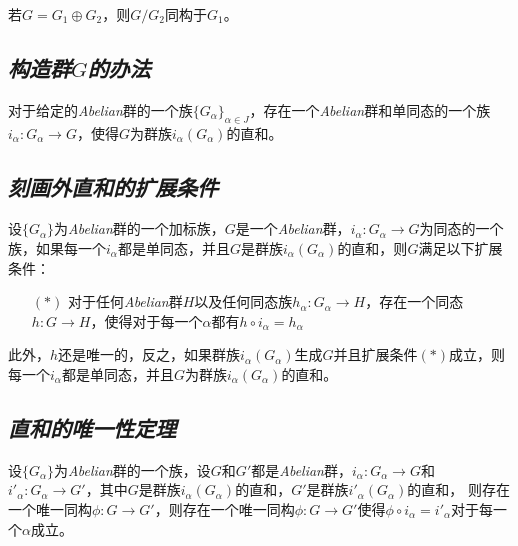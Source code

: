 \begin{mdframed}
    \begin{corollary}
        若$G=G_1\oplus G_2$，则$G/G_2$同构于$G_1$。
    \end{corollary}
\end{mdframed}

\subsection*{\textsl{构造群$G$的办法}}

\begin{mdframed}
    \begin{theorem}
        对于给定的\textsl{Abelian}群的一个族$\{G_\alpha\}_{\alpha\in J}$，存在一个\textsl{Abelian}群和单同态的一个族$i_\alpha:G_\alpha\rightarrow G$，使得$G$为群族$i_\alpha(G_\alpha)$的直和。
    \end{theorem}
\end{mdframed}

\subsection*{\textsl{刻画外直和的扩展条件}}

\begin{mdframed}
    \begin{theorem}
        设$\{G_\alpha\}$为\textsl{Abelian}群的一个加标族，$G$是一个\textsl{Abelian}群，$i_\alpha:G_\alpha\rightarrow G$为同态的一个族，如果每一个$i_\alpha$都是单同态，并且$G$是群族$i_\alpha(G_\alpha)$的直和，则$G$满足以下扩展条件：
        \begin{enumerate}[itemindent=2em]
            \item[$(*)$] 对于任何\textsl{Abelian}群$H$以及任何同态族$h_\alpha:G_\alpha\rightarrow H$，存在一个同态$h:G\rightarrow H$，使得对于每一个$\alpha$都有$h\circ i_\alpha=h_\alpha$
        \end{enumerate}

        此外，$h$还是唯一的，反之，如果群族$i_\alpha(G_\alpha)$生成$G$并且扩展条件$(*)$成立，则每一个$i_\alpha$都是单同态，并且$G$为群族$i_\alpha(G_\alpha)$的直和。
    \end{theorem}
\end{mdframed}

\subsection*{\textsl{直和的唯一性定理}}

\begin{mdframed}
    \begin{theorem}
        设$\{G_\alpha\}$为\textsl{Abelian}群的一个族，设$G$和$G'$都是\textsl{Abelian}群，$i_\alpha:G_\alpha\rightarrow G$和$i'_\alpha:G_\alpha\rightarrow G'$，其中$G$是群族$i_\alpha(G_\alpha)$的直和，$G'$是群族$i'_\alpha(G_\alpha)$的直和，
        则存在一个唯一同构$\phi:G\rightarrow G'$，则存在一个唯一同构$\phi:G\rightarrow G'$使得$\phi\circ i_\alpha=i'_\alpha$对于每一个$\alpha$成立。
    \end{theorem}
\end{mdframed}

